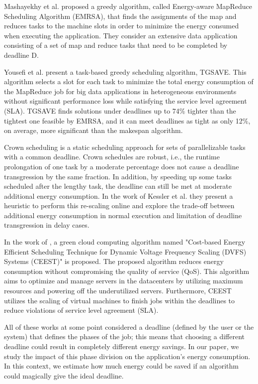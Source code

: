 Mashayekhy et al. \cite{Mashayekhy2014} proposed a greedy algorithm, called Energy-aware  MapReduce  Scheduling  Algorithm  (EMRSA), that finds the assignments of the map and reduces tasks to the machine slots in order to minimize the energy consumed when executing the application. They consider an extensive data application consisting of a set of map and reduce tasks that need to be completed by deadline D.

Yousefi et al. \cite{Yousefi2018} present a task-based greedy scheduling algorithm, TGSAVE. This algorithm selects a slot for each task to minimize the total energy consumption of the MapReduce job for big data applications in heterogeneous environments without significant performance loss while satisfying the service level agreement (SLA). TGSAVE  finds solutions under deadlines up to 74\% tighter than the tightest one feasible by EMRSA, and it can meet deadlines as tight as only 12\%, on average, more significant than the makespan algorithm.

Crown scheduling is a static scheduling approach for sets of parallelizable tasks with a common deadline. Crown schedules are robust, i.e., the runtime prolongation of one task by a moderate percentage does not cause a deadline transgression by the same fraction. In addition, by speeding up some tasks scheduled after the lengthy task, the deadline can still be met at moderate additional energy consumption. In the work of Kessler et al. \cite{Kessler2021} they present a heuristic to perform this re-scaling online and explore the trade-off between additional energy consumption in normal execution and limitation of deadline transgression in delay cases.


In the work of \cite{Ajmal2021}, a green cloud computing algorithm named "Cost-based Energy Efficient Scheduling Technique for Dynamic Voltage Frequency Scaling (DVFS) Systems (CEEST)" is proposed. The proposed algorithm reduces energy consumption without compromising the quality of service (QoS). This algorithm aims to optimize and manage servers in the datacenters by utilizing maximum resources and powering off the underutilized servers. Furthermore, CEEST utilizes the scaling of virtual machines to finish jobs within the deadlines to reduce violations of service level agreement (SLA). 

All of these works at some point considered a deadline (defined by the user or the system) that defines the phases of the job; this means that choosing a different deadline could result in completely different energy savings. In our paper, we study the impact of this phase division on the application's energy consumption. In this context, we estimate how much energy could be saved if an algorithm could magically give the ideal deadline.

